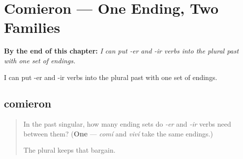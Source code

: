 
\chapter{Comieron --- One Ending, Two Families}
\label{ch:comieron}

\begin{chapteropening}
\textbf{By the end of this chapter:} \emph{I can put -er and -ir verbs into the plural past with one set of endings.}

I can put -er and -ir verbs into the plural past with one set of endings.
\end{chapteropening}

\section[comieron]{comieron}

\label{lesson:ES-C55-comieron}



\begin{quote}
In the past singular, how many ending sets do \emph{-er} and \emph{-ir} verbs need between them? (\textbf{One} — \emph{comí} and \emph{viví} take the same endings.)

The plural keeps that bargain.
\end{quote}

